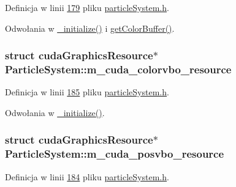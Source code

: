 Definicja w linii \hyperlink{particle_system_8h_source_l00179}{179} pliku \hyperlink{particle_system_8h_source}{particle\-System.\-h}.



Odwołania w \hyperlink{particle_system_8cpp_source_l00123}{\-\_\-initialize()} i \hyperlink{particle_system_8h_source_l00057}{get\-Color\-Buffer()}.

\hypertarget{class_particle_system_a140043869727535abc08609b835b98fc}{
\subsubsection[{m\-\_\-cuda\-\_\-colorvbo\-\_\-resource}]{\setlength{\rightskip}{0pt plus 5cm}struct cuda\-Graphics\-Resource$\ast$ Particle\-System\-::m\-\_\-cuda\-\_\-colorvbo\-\_\-resource\hspace{0.3cm}{\ttfamily [protected]}}}\label{class_particle_system_a140043869727535abc08609b835b98fc}


Definicja w linii \hyperlink{particle_system_8h_source_l00185}{185} pliku \hyperlink{particle_system_8h_source}{particle\-System.\-h}.



Odwołania w \hyperlink{particle_system_8cpp_source_l00123}{\-\_\-initialize()}.

\hypertarget{class_particle_system_a9c5de70c1705672e5722ad30dee1b14b}{
\subsubsection[{m\-\_\-cuda\-\_\-posvbo\-\_\-resource}]{\setlength{\rightskip}{0pt plus 5cm}struct cuda\-Graphics\-Resource$\ast$ Particle\-System\-::m\-\_\-cuda\-\_\-posvbo\-\_\-resource\hspace{0.3cm}{\ttfamily [protected]}}}\label{class_particle_system_a9c5de70c1705672e5722ad30dee1b14b}


Definicja w linii \hyperlink{particle_system_8h_source_l00184}{184} pliku \hyperlink{particle_system_8h_source}{particle\-System.\-h}.



